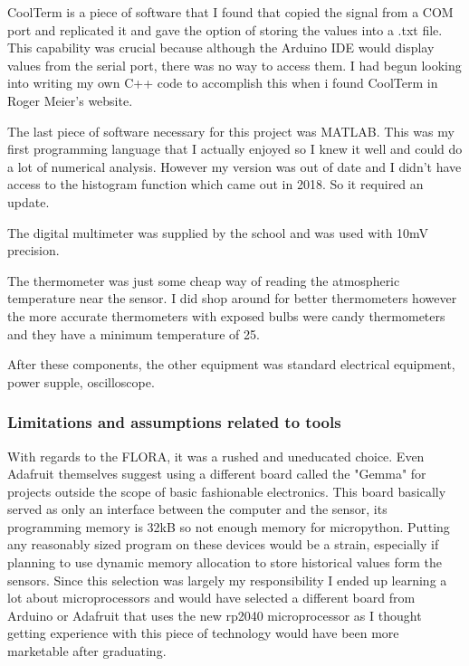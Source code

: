 \documentclass[12pt,a4paper]{report}
\begin{document}
    CoolTerm is a piece of software that I found that copied the signal from a COM port and replicated it and gave the option of storing the values into a .txt file. This capability was crucial because although the Arduino IDE would display values from the serial port, there was no way to access them. I had begun looking into writing my own C++ code to accomplish this when i found CoolTerm in Roger Meier's website\cite{CoolTerm}.\par
        
    The last piece of software necessary for this project was MATLAB. This was my first programming language that I actually enjoyed so I knew it well and could do a lot of numerical analysis. However my version was out of date and I didn't have access to the histogram function which came out in 2018. So it required an update.\par
    
    The digital multimeter was supplied by the school and was used with 10mV precision.
       
    The thermometer was just some cheap way of reading the atmospheric temperature near the sensor. I did shop around for better thermometers however the more accurate thermometers with exposed bulbs were candy thermometers and they have a minimum temperature of 25\textcelsius{}.\par
    
    After these components, the other equipment was standard electrical equipment, power supple, oscilloscope.
        
        
        
    \subsubsection{Limitations and assumptions related to tools}
        With regards to the FLORA, it was a rushed and uneducated choice. Even Adafruit themselves suggest using a different board called the "Gemma" for projects outside the scope of basic fashionable electronics. This board basically served as only an interface between the computer and the sensor, its programming memory is 32kB so not enough memory for micropython. Putting any reasonably sized program on these devices would be a strain, especially if planning to use dynamic memory allocation to store historical values form the sensors. Since this selection was largely my responsibility I ended up learning a lot about microprocessors and would have selected a different board from Arduino or Adafruit that uses the new rp2040 microprocessor as I thought getting experience with this piece of technology would have been more marketable after graduating.\par
    
\end{document}
